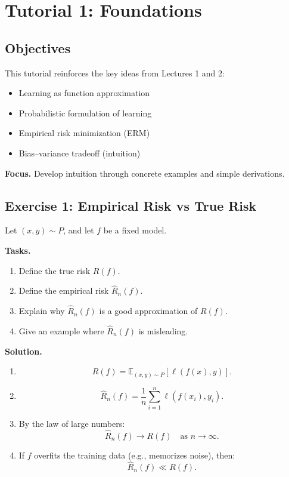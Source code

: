 \section{Tutorial 1: Foundations}

\subsection{Objectives}

This tutorial reinforces the key ideas from Lectures 1 and 2:
\begin{itemize}
    \item Learning as function approximation
    \item Probabilistic formulation of learning
    \item Empirical risk minimization (ERM)
    \item Bias--variance tradeoff (intuition)
\end{itemize}

\medskip

\noindent
\textbf{Focus.}  
Develop intuition through concrete examples and simple derivations.

\subsection{Exercise 1: Empirical Risk vs True Risk}

Let $(x,y) \sim P$, and let $f$ be a fixed model.

\medskip

\noindent
\textbf{Tasks.}
\begin{enumerate}
    \item Define the true risk $R(f)$.
    \item Define the empirical risk $\hat{R}_n(f)$.
    \item Explain why $\hat{R}_n(f)$ is a good approximation of $R(f)$.
    \item Give an example where $\hat{R}_n(f)$ is misleading.
\end{enumerate}

\medskip

\noindent
\textbf{Solution.}

\begin{enumerate}
    \item 
    \[
    R(f) = \mathbb{E}_{(x,y)\sim P}[\ell(f(x),y)].
    \]

    \item 
    \[
    \hat{R}_n(f) = \frac{1}{n} \sum_{i=1}^n \ell(f(x_i), y_i).
    \]

    \item By the law of large numbers:
    \[
    \hat{R}_n(f) \to R(f) \quad \text{as } n \to \infty.
    \]

    \item If $f$ overfits the training data (e.g., memorizes noise), then:
    \[
    \hat{R}_n(f) \ll R(f).
    \]
\end{enumerate}

